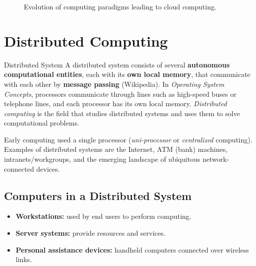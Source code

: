 \documentclass[11pt,a4paper,openany]{report}
\begin{document}
\begin{figure}[H]
\centering
{}
\caption{Evolution of computing paradigms leading to cloud computing.}
\end{figure}

\section{Distributed Computing}
\begin{defbox}{Distributed System}
A distributed system consists of several \textbf{autonomous computational entities}, each
with its \textbf{own local memory}, that communicate with each other by \textbf{message passing}
(Wikipedia). In \emph{Operating System Concepts}, processors communicate through lines such as
high-speed buses or telephone lines, and each processor has its own local memory.
\emph{Distributed computing} is the field that studies distributed systems and uses them to
solve computational problems.
\end{defbox}

Early computing used a single processor (\emph{uni-processor} or \emph{centralized}
computing). Examples of distributed systems are the Internet, ATM (bank) machines,
intranets/workgroups, and the emerging landscape of ubiquitous network-connected devices.

\subsection{Computers in a Distributed System}
\begin{itemize}[leftmargin=*]
  \item \textbf{Workstations:} used by end users to perform computing.
  \item \textbf{Server systems:} provide resources and services.
  \item \textbf{Personal assistance devices:} handheld computers connected over wireless links.
\end{itemize}
\end{document}

